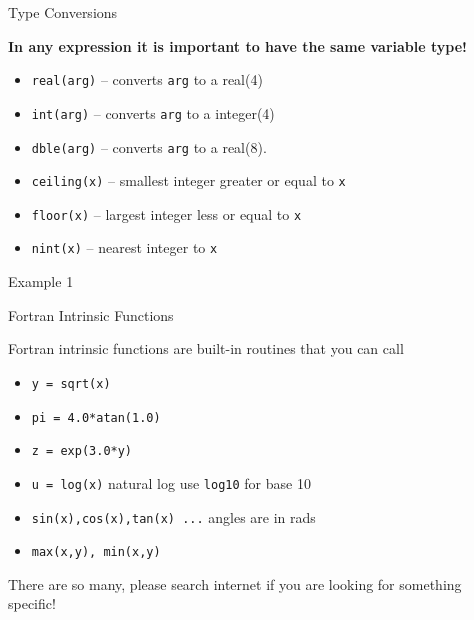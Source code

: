 \documentclass{beamer}
\begin{document}
\begin{frame}{Type Conversions}

\textbf{In any expression it is important to have the same variable type!}
\vfill
  \begin{itemize}
    \item\texttt{real(arg)} -- converts \texttt{arg} to a real(4)
    \vfill\item\texttt{int(arg)} -- converts \texttt{arg} to a integer(4)
    \vfill\item\texttt{dble(arg)} -- converts \texttt{arg} to a real(8).
    \vfill\item\texttt{ceiling(x)} -- smallest integer greater or equal to \texttt{x}
    \vfill\item\texttt{floor(x)} -- largest integer less or equal to \texttt{x}
    \vfill\item\texttt{nint(x)} -- nearest integer to \texttt{x}
  \end{itemize}

\end{frame}
\begin{frame}
\begin{center}
\Huge{Example 1}
\end{center}
\end{frame}
\begin{frame}{Fortran Intrinsic Functions}

Fortran intrinsic functions are built-in routines that you can call
\vfill
\begin{itemize}
  \item \texttt{y = sqrt(x)}
  \vfill\item \texttt{pi = 4.0*atan(1.0)}
  \vfill\item \texttt{z = exp(3.0*y)}
  \vfill\item \texttt{u = log(x)} natural log use \texttt{log10} for base 10
  \vfill\item \texttt{sin(x),cos(x),tan(x) ...} {\color{red}angles are in rads}
  \vfill\item \texttt{max(x,y), min(x,y)}
\end{itemize}
\vfill
There are so many, please search internet if you are looking for something specific!
\end{frame}
\end{document}
